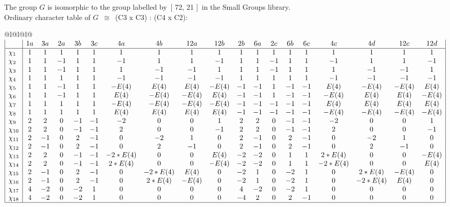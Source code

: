 \documentclass[varwidth=\maxdimen,border=10]{standalone}
\begin{document}
The group $G$ is isomorphic to the group labelled by\ [ 72, 21 ]\ in the Small Groups library.\\
Ordinary character table of $G$\ $\cong$\ (C3 x C3) : (C4 x C2):\\
\begin{center}
\begin{tabular}{@{}l@{}l@{}l@{}}
\hline
\(\begin{array}{|l|cccccccccccccccccc|}
  & 1a & 3a & 2a & 3b & 3c & 4a & 4b & 12a & 12b & 2b & 6a & 2c & 6b & 6c & 4c & 4d & 12c & 12d\\ \hline
\chi_{1} & 1 & 1 & 1 & 1 & 1 & 1 & 1 & 1 & 1 & 1 & 1 & 1 & 1 & 1 & 1 & 1 & 1 & 1\\
\chi_{2} & 1 & 1 & -1 & 1 & 1 & -1 & 1 & 1 & -1 & 1 & 1 & -1 & 1 & 1 & -1 & 1 & 1 & -1\\
\chi_{3} & 1 & 1 & -1 & 1 & 1 & 1 & -1 & -1 & 1 & 1 & 1 & -1 & 1 & 1 & 1 & -1 & -1 & 1\\
\chi_{4} & 1 & 1 & 1 & 1 & 1 & -1 & -1 & -1 & -1 & 1 & 1 & 1 & 1 & 1 & -1 & -1 & -1 & -1\\
\chi_{5} & 1 & 1 & -1 & 1 & 1 & -E(4) & E(4) & E(4) & -E(4) & -1 & -1 & 1 & -1 & -1 & E(4) & -E(4) & -E(4) & E(4)\\
\chi_{6} & 1 & 1 & -1 & 1 & 1 & E(4) & -E(4) & -E(4) & E(4) & -1 & -1 & 1 & -1 & -1 & -E(4) & E(4) & E(4) & -E(4)\\
\chi_{7} & 1 & 1 & 1 & 1 & 1 & -E(4) & -E(4) & -E(4) & -E(4) & -1 & -1 & -1 & -1 & -1 & E(4) & E(4) & E(4) & E(4)\\
\chi_{8} & 1 & 1 & 1 & 1 & 1 & E(4) & E(4) & E(4) & E(4) & -1 & -1 & -1 & -1 & -1 & -E(4) & -E(4) & -E(4) & -E(4)\\
\chi_{9} & 2 & 2 & 0 & -1 & -1 & -2 & 0 & 0 & 1 & 2 & 2 & 0 & -1 & -1 & -2 & 0 & 0 & 1\\
\chi_{10} & 2 & 2 & 0 & -1 & -1 & 2 & 0 & 0 & -1 & 2 & 2 & 0 & -1 & -1 & 2 & 0 & 0 & -1\\
\chi_{11} & 2 & -1 & 0 & 2 & -1 & 0 & -2 & 1 & 0 & 2 & -1 & 0 & 2 & -1 & 0 & -2 & 1 & 0\\
\chi_{12} & 2 & -1 & 0 & 2 & -1 & 0 & 2 & -1 & 0 & 2 & -1 & 0 & 2 & -1 & 0 & 2 & -1 & 0\\
\chi_{13} & 2 & 2 & 0 & -1 & -1 & -2*E(4) & 0 & 0 & E(4) & -2 & -2 & 0 & 1 & 1 & 2*E(4) & 0 & 0 & -E(4)\\
\chi_{14} & 2 & 2 & 0 & -1 & -1 & 2*E(4) & 0 & 0 & -E(4) & -2 & -2 & 0 & 1 & 1 & -2*E(4) & 0 & 0 & E(4)\\
\chi_{15} & 2 & -1 & 0 & 2 & -1 & 0 & -2*E(4) & E(4) & 0 & -2 & 1 & 0 & -2 & 1 & 0 & 2*E(4) & -E(4) & 0\\
\chi_{16} & 2 & -1 & 0 & 2 & -1 & 0 & 2*E(4) & -E(4) & 0 & -2 & 1 & 0 & -2 & 1 & 0 & -2*E(4) & E(4) & 0\\
\chi_{17} & 4 & -2 & 0 & -2 & 1 & 0 & 0 & 0 & 0 & 4 & -2 & 0 & -2 & 1 & 0 & 0 & 0 & 0\\
\chi_{18} & 4 & -2 & 0 & -2 & 1 & 0 & 0 & 0 & 0 & -4 & 2 & 0 & 2 & -1 & 0 & 0 & 0 & 0\\
\hline
\end{array}\)\\
\end{tabular}
\end{center}
\end{document}
